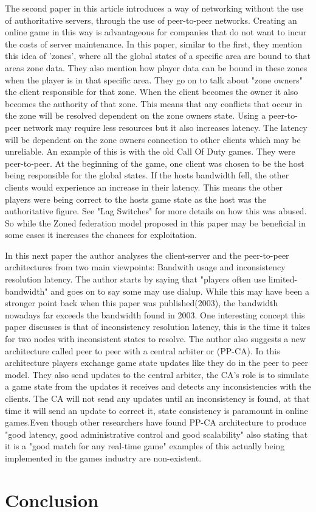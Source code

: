\documentclass{scrartcl}
\begin{document}
The second paper in this article introduces a way of networking without the use of authoritative servers, through the use of peer-to-peer networks\cite{iimura2004zoned}. Creating an online game in this way is advantageous for companies that do not want to incur the costs of server maintenance.  In this paper, similar to the first, they mention this idea of  'zones', where all the global states of a specific area are bound to that areas zone data. They also mention how player data can be bound in these zones when the player is in that specific area. They go on to talk about "zone owners" the client responsible for that zone. When the client becomes the owner it also becomes the authority of that zone. This means that any conflicts that occur in the zone will be resolved dependent on the zone owners state. Using a peer-to-peer network may require less resources but it also increases latency. The latency will be dependent on the zone owners connection to other clients which may be unreliable. An example of this is with the old Call Of Duty games. They were peer-to-peer. At the beginning of the game, one client was chosen to be the host being responsible for the global states. If the hosts bandwidth fell, the other clients would experience an increase in their latency. This means the other players were being correct to the hosts game state as the host was the authoritative figure. See "Lag Switches"\cite {LagSwitch} for more details on how this was abused. So while the Zoned federation model proposed in this paper may be beneficial in some cases it increases the chances for exploitation.

In this next paper\cite {pellegrino2003bandwidth} the author analyses the client-server and the peer-to-peer architectures from two main viewpoints: Bandwith usage and inconsistency  resolution latency. The author starts by saying that "players often use limited-bandwidth" and goes on to say some may use dialup. While this may have been a stronger point back when this paper was published(2003), the bandwidth nowadays far exceeds the bandwidth found in 2003. One interesting concept this paper discusses is that of inconsistency resolution latency, this is the time it takes for two nodes with inconsistent states to resolve. The author also suggests a new architecture called peer to peer with a central arbiter or (PP-CA). In this architecture players exchange game state updates like they do in the peer to peer model. They also send updates to the central arbiter, the CA's role is to simulate a game state from the updates it receives and detects any inconsistencies with the clients. The CA will not send any updates until an inconsistency is found, at that time it will send an update to correct it, state consistency is paramount in online games\cite {pantel2002impact}.Even though other researchers have found PP-CA architecture to produce "good latency, good administrative control and good scalability"\cite[p.22]{sutinrerk2006mirrored} also stating that it is a "good match for any real-time game"\cite[p.22]{sutinrerk2006mirrored} examples of this actually being implemented in the games industry are non-existent. 






\section{Conclusion}




\end{document}
